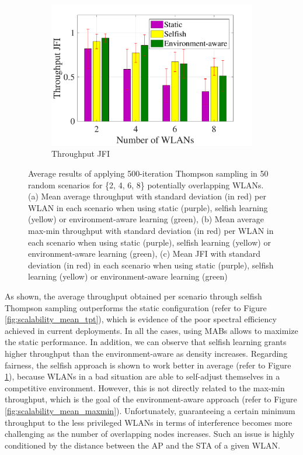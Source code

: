 \documentclass{article}
\begin{document}
\begin{figure}[h!]
\begin{subfigure}[b]{0.3\textwidth}
		\includegraphics[width=\textwidth]{scalability_mean_jfi}
		\caption{Throughput JFI}
		\label{fig:scalability_mean_jfi}
	\end{subfigure}
	\caption{Average results of applying 500-iteration Thompson sampling in 50 random scenarios for \{2, 4, 6, 8\} potentially overlapping WLANs. (a) Mean average throughput with standard deviation (in red) per WLAN in each scenario when using static (purple), selfish learning (yellow) or environment-aware learning (green), (b) Mean average max-min throughput with standard deviation (in red) per WLAN in each scenario when using static (purple), selfish learning (yellow) or environment-aware learning (green), (c) Mean JFI with standard deviation (in red) in each scenario when using static (purple), selfish learning (yellow) or environment-aware learning (green)}
	\label{fig:scalability_results}
\end{figure}	

As shown, the average throughput obtained per scenario through selfish Thompson sampling outperforms the static configuration (refer to Figure \ref{fig:scalability_mean_tpt}), which is evidence of the poor spectral efficiency achieved in current deployments. In all the cases, using MABs allows to maximize the static performance. In addition, we can observe that selfish learning grants higher throughput than the environment-aware as density increases. Regarding fairness, the selfish approach is shown to work better in average (refer to Figure \ref{fig:scalability_mean_jfi}), because WLANs in a bad situation are able to self-adjust themselves in a competitive environment. However, this is not directly related to the max-min throughput, which is the goal of the environment-aware approach (refer to Figure \ref{fig:scalability_mean_maxmin}). Unfortunately, guaranteeing a certain minimum throughput to the less privileged WLANs in terms of interference becomes more challenging as the number of overlapping nodes increases. Such an issue is highly conditioned by the distance between the AP and the STA of a given WLAN.
\end{document}
